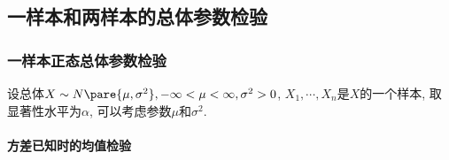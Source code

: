 \documentclass[../Statistics.tex]{subfiles}
\begin{document}


\subsection{一样本和两样本的总体参数检验} %
\label{sub:一样本和两样本的总体参数检验}

\subsubsection{一样本正态总体参数检验} %
\label{ssub:一样本正态总体参数检验}

设总体$X\sim N\pare{\mu,\sigma^2}, -\infty<\mu<\infty, \sigma^2>0$, $X_1,\cdots,X_n$是$X$的一个样本, 取显著性水平为$\alpha$, 可以考虑参数$\mu$和$\sigma^2$.

\paragraph{方差已知时的均值检验} %
\label{par:方差已知时的均值检验}
\end{document}
